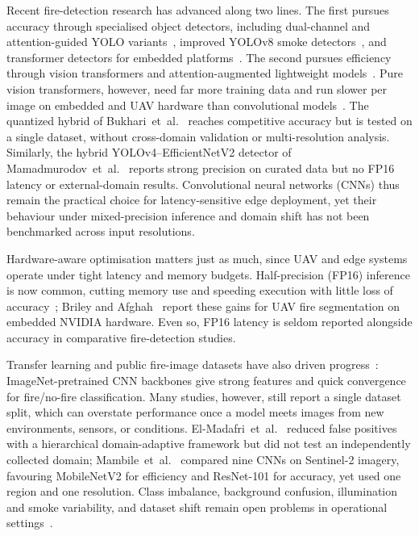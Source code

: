 \documentclass[conference]{IEEEtran}
\begin{document}
Recent fire-detection research has advanced along two lines. The first pursues accuracy through specialised object detectors, including dual-channel and attention-guided YOLO variants~\cite{he2024dcgc, yu2025improved}, improved YOLOv8 smoke detectors~\cite{zhang2024research}, and transformer detectors for embedded platforms~\cite{zheng2024fta}. The second pursues efficiency through vision transformers and attention-augmented lightweight models~\cite{kluska2024qattn, bukhari2025irtq}. Pure vision transformers, however, need far more training data and run slower per image on embedded and UAV hardware than convolutional models~\cite{kluska2024qattn}. The quantized hybrid of Bukhari~et~al.~\cite{bukhari2025irtq} reaches competitive accuracy but is tested on a single dataset, without cross-domain validation or multi-resolution analysis. Similarly, the hybrid YOLOv4--EfficientNetV2 detector of Mamadmurodov~et~al.~\cite{mamadmurodov2025hybrid} reports strong precision on curated data but no FP16 latency or external-domain results. Convolutional neural networks (CNNs) thus remain the practical choice for latency-sensitive edge deployment, yet their behaviour under mixed-precision inference and domain shift has not been benchmarked across input resolutions.

Hardware-aware optimisation matters just as much, since UAV and edge systems operate under tight latency and memory budgets. Half-precision (FP16) inference is now common, cutting memory use and speeding execution with little loss of accuracy~\cite{kluska2024qattn, nvidia2023mixed}; Briley and Afghah~\cite{briley2024hardware} report these gains for UAV fire segmentation on embedded NVIDIA hardware. Even so, FP16 latency is seldom reported alongside accuracy in comparative fire-detection studies.

Transfer learning and public fire-image datasets have also driven progress~\cite{saleh2024review}: ImageNet-pretrained CNN backbones give strong features and quick convergence for fire/no-fire classification. Many studies, however, still report a single dataset split, which can overstate performance once a model meets images from new environments, sensors, or conditions. El-Madafri~et~al.~\cite{elmadafri2024dual} reduced false positives with a hierarchical domain-adaptive framework but did not test an independently collected domain; Mambile~et~al.~\cite{mambile2025cnn} compared nine CNNs on Sentinel-2 imagery, favouring MobileNetV2 for efficiency and ResNet-101 for accuracy, yet used one region and one resolution. Class imbalance, background confusion, illumination and smoke variability, and dataset shift remain open problems in operational settings~\cite{elmadafri2024dual, saleh2024review}.
\end{document}
